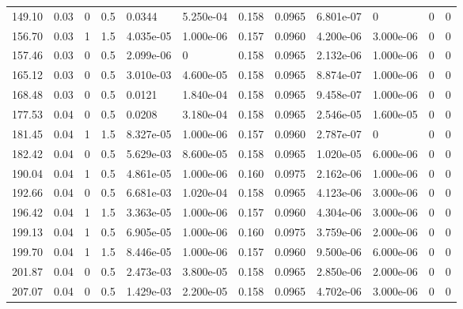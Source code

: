 \documentclass[preview]{standalone}
\begin{document}
{{\begin{tabular}{L{1.2cm}C{1.2cm} C{0.3cm}C{0.5cm} C{1.4cm}C{1.4cm} C{1.4cm}C{1.4cm} C{1.6cm}C{1.6cm} C{1.6cm}C{1.6cm}}
  149.10  &  0.03  & 0     & 0.5 &  0.0344  & 5.250e-04  &  0.158&   0.0965& 6.801e-07 & 0   &  0 & 0  \\ 
  156.70  &  0.03  & 1     & 1.5 &  4.035e-05  & 1.000e-06  &  0.157&   0.0960& 4.200e-06 & 3.000e-06   &  0 & 0  \\ 
  157.46  &  0.03  & 0     & 0.5 &  2.099e-06  & 0  &  0.158&   0.0965& 2.132e-06 & 1.000e-06   &  0 & 0  \\ 
  165.12  &  0.03  & 0     & 0.5 &  3.010e-03  & 4.600e-05  &  0.158&   0.0965& 8.874e-07 & 1.000e-06   &  0 & 0  \\ 
  168.48  &  0.03  & 0     & 0.5 &  0.0121  & 1.840e-04  &  0.158&   0.0965& 9.458e-07 & 1.000e-06   &  0 & 0  \\ 
  177.53  &  0.04  & 0     & 0.5 &  0.0208  & 3.180e-04  &  0.158&   0.0965& 2.546e-05 & 1.600e-05   &  0 & 0  \\ 
  181.45  &  0.04  & 1     & 1.5 &  8.327e-05  & 1.000e-06  &  0.157&   0.0960& 2.787e-07 & 0   &  0 & 0  \\ 
  182.42  &  0.04  & 0     & 0.5 &  5.629e-03  & 8.600e-05  &  0.158&   0.0965& 1.020e-05 & 6.000e-06   &  0 & 0  \\ 
  190.04  &  0.04  & 1     & 0.5 &  4.861e-05  & 1.000e-06  &  0.160&   0.0975& 2.162e-06 & 1.000e-06   &  0 & 0  \\ 
  192.66  &  0.04  & 0     & 0.5 &  6.681e-03  & 1.020e-04  &  0.158&   0.0965& 4.123e-06 & 3.000e-06   &  0 & 0  \\ 
  196.42  &  0.04  & 1     & 1.5 &  3.363e-05  & 1.000e-06  &  0.157&   0.0960& 4.304e-06 & 3.000e-06   &  0 & 0  \\ 
  199.13  &  0.04  & 1     & 0.5 &  6.905e-05  & 1.000e-06  &  0.160&   0.0975& 3.759e-06 & 2.000e-06   &  0 & 0  \\ 
  199.70  &  0.04  & 1     & 1.5 &  8.446e-05  & 1.000e-06  &  0.157&   0.0960& 9.500e-06 & 6.000e-06   &  0 & 0  \\ 
  201.87  &  0.04  & 0     & 0.5 &  2.473e-03  & 3.800e-05  &  0.158&   0.0965& 2.850e-06 & 2.000e-06   &  0 & 0  \\ 
  207.07  &  0.04  & 0     & 0.5 &  1.429e-03  & 2.200e-05  &  0.158&   0.0965& 4.702e-06 & 3.000e-06   &  0 & 0  \\ 
\hline 
\end{tabular} 

}}
\end{document}
